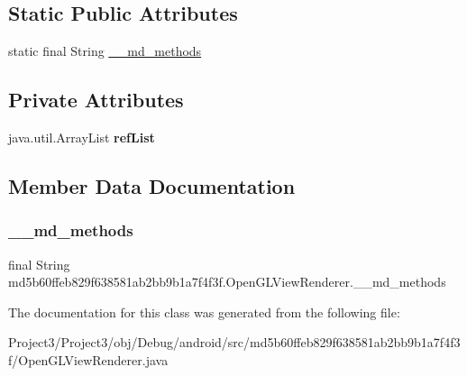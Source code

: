 \subsection*{Static Public Attributes}
\begin{DoxyCompactItemize}
\item 
static final String \hyperlink{classmd5b60ffeb829f638581ab2bb9b1a7f4f3f_1_1OpenGLViewRenderer_a55f0f0092c5140b38cf1f7aba5594097}{\+\_\+\+\_\+md\+\_\+methods}
\end{DoxyCompactItemize}
\subsection*{Private Attributes}
\begin{DoxyCompactItemize}
\item 
\mbox{\label{classmd5b60ffeb829f638581ab2bb9b1a7f4f3f_1_1OpenGLViewRenderer_a05996987d150ac96a4aabf32c1f4901c}} 
java.\+util.\+Array\+List {\bfseries ref\+List}
\end{DoxyCompactItemize}


\subsection{Member Data Documentation}
\mbox{\label{classmd5b60ffeb829f638581ab2bb9b1a7f4f3f_1_1OpenGLViewRenderer_a55f0f0092c5140b38cf1f7aba5594097}} 
\subsubsection{\texorpdfstring{\+\_\+\+\_\+md\+\_\+methods}{\_\_md\_methods}}
{\footnotesize\ttfamily final String md5b60ffeb829f638581ab2bb9b1a7f4f3f.\+Open\+G\+L\+View\+Renderer.\+\_\+\+\_\+md\+\_\+methods\hspace{0.3cm}{\ttfamily [static]}}



The documentation for this class was generated from the following file\+:\begin{DoxyCompactItemize}
\item 
Project3/\+Project3/obj/\+Debug/android/src/md5b60ffeb829f638581ab2bb9b1a7f4f3f/Open\+G\+L\+View\+Renderer.\+java\end{DoxyCompactItemize}

